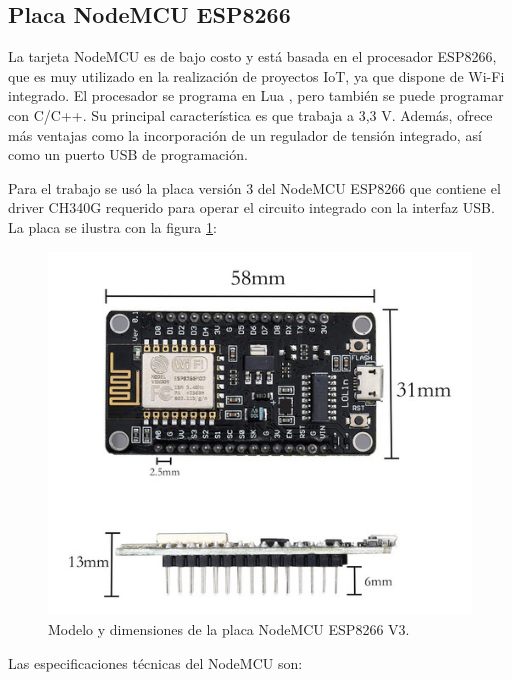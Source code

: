 \subsection{Placa NodeMCU ESP8266}

La tarjeta NodeMCU es de bajo costo y está basada en el procesador ESP8266, que es muy utilizado en la realización de proyectos IoT, ya que dispone de Wi-Fi integrado. El procesador se programa en Lua \citep{WEBSITE:38}, pero también se puede programar con C/C++. Su principal característica es que trabaja a 3,3 V.  Además, ofrece más ventajas como la incorporación de un regulador de tensión integrado, así como un puerto USB de programación. 

 
Para el trabajo se usó la placa versión 3 del NodeMCU ESP8266 que contiene el driver CH340G requerido para operar el circuito integrado con la interfaz USB. La placa se ilustra con la figura \ref{fig:nodemcu}:

\begin{figure}[htbp]
	\centering
	\includegraphics[width=.8\textwidth]{./Figures/nodemcuV3.jpg}
	\caption{Modelo y dimensiones de la placa NodeMCU ESP8266 V3.}

	\label{fig:nodemcu}
\end{figure}

Las especificaciones técnicas del NodeMCU son:

